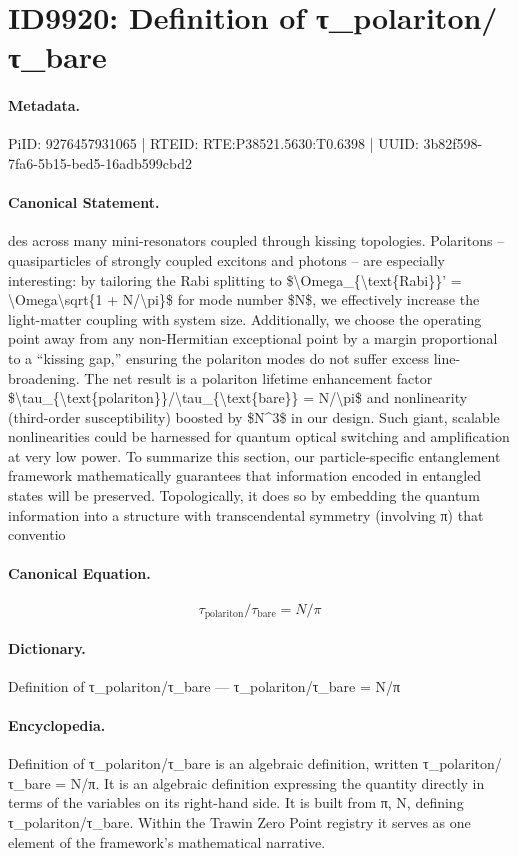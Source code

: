 \section*{ID9920: Definition of τ\_polariton/τ\_bare}
\paragraph{Metadata.}
PiID: 9276457931065 | RTEID: RTE:P38521.5630:T0.6398 | UUID: 3b82f598-7fa6-5b15-bed5-16adb599cbd2

\paragraph{Canonical Statement.}
des across many mini-resonators coupled through kissing topologies. Polaritons – quasiparticles of strongly coupled excitons and photons – are especially interesting: by tailoring the Rabi splitting to \$\textbackslash{}Omega\_\{\textbackslash{}text\{Rabi\}\}' = \textbackslash{}Omega\textbackslash{}sqrt\{1 + N/\textbackslash{}pi\}\$ for mode number \$N\$, we effectively increase the light-matter coupling with system size. Additionally, we choose the operating point away from any non-Hermitian exceptional point by a margin proportional to a “kissing gap,” ensuring the polariton modes do not suffer excess line-broadening. The net result is a polariton lifetime enhancement factor \$\textbackslash{}tau\_\{\textbackslash{}text\{polariton\}\}/\textbackslash{}tau\_\{\textbackslash{}text\{bare\}\} = N/\textbackslash{}pi\$ and nonlinearity (third-order susceptibility) boosted by \$N\textasciicircum{}3\$ in our design. Such giant, scalable nonlinearities could be harnessed for quantum optical switching and amplification at very low power. To summarize this section, our particle-specific entanglement framework mathematically guarantees that information encoded in entangled states will be preserved. Topologically, it does so by embedding the quantum information into a structure with transcendental symmetry (involving π) that conventio

\paragraph{Canonical Equation.}
\[
\tau_{\text{polariton}}/\tau_{\text{bare}} = N/\pi
\]

\paragraph{Dictionary.}
Definition of τ\_polariton/τ\_bare — τ\_polariton/τ\_bare = N/π

\paragraph{Encyclopedia.}
Definition of τ\_polariton/τ\_bare is an algebraic definition, written τ\_polariton/τ\_bare = N/π. It is an algebraic definition expressing the quantity directly in terms of the variables on its right-hand side. It is built from π, N, defining τ\_polariton/τ\_bare. Within the Trawin Zero Point registry it serves as one element of the framework's mathematical narrative.
